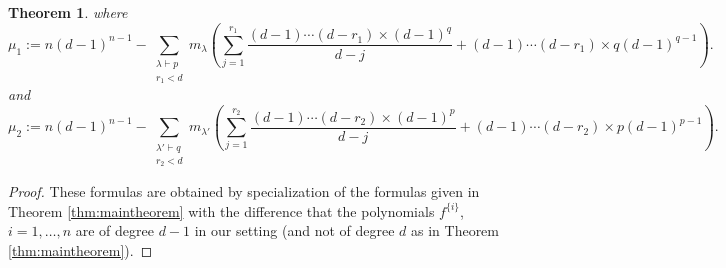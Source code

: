 \documentclass[12pt,a4paper,reqno]{amsart}
\newtheorem{theorem}{Theorem}[section]
\theoremstyle{definition}
\theoremstyle{remark}
\numberwithin{equation}{section}
\begin{document}
\begin{theorem}
where
 \begin{equation*}
    \mu_1:=n(d-1)^{n-1}-\sum_{ \substack{\lambda\vdash p \\ r_1 < d}} m_{\lambda} 
   \left(\sum_{j=1}^{r_1}\dfrac{(d-1)\cdots(d-r_1)\times (d-1)^q}{d-j}+(d-1)\cdots(d-r_1)\times q(d-1)^{q-1} \right).
   \end{equation*}
   and
 \begin{equation*}
    \mu_2:=n(d-1)^{n-1}-\sum_{ \substack{\lambda'\vdash q \\ r_2 < d}} m_{\lambda'} 
   \left(\sum_{j=1}^{r_2}\dfrac{(d-1)\cdots(d-r_2)\times (d-1)^p}{d-j}+(d-1)\cdots(d-r_2)\times p(d-1)^{p-1} \right).
   \end{equation*}
\end{theorem}

\begin{proof}
These formulas are obtained by specialization of the formulas given in Theorem \ref{thm:maintheorem} with the difference that the polynomials $f^{\{i\}}$, $i=1,\ldots,n$ are of degree $d-1$ in our setting (and not of degree $d$ as in Theorem \ref{thm:maintheorem}).
\end{proof}
\end{document}
